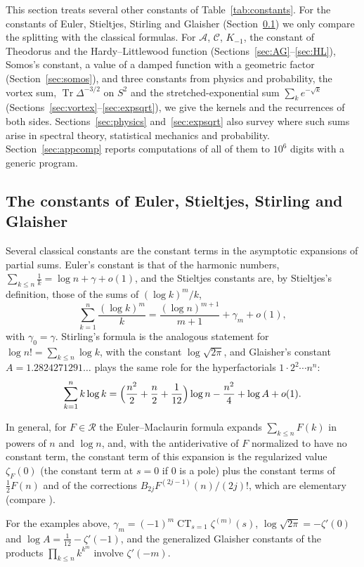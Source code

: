 \documentclass[11pt,reqno]{amsart}
\theoremstyle{definition}
\theoremstyle{remark}
\newcommand{\Reg}{\mathcal{R}}
\newcommand{\CT}{\operatorname*{CT}}
\begin{document}
This section treats several other constants of Table~\ref{tab:constants}. For the constants of Euler, Stieltjes, Stirling and
Glaisher (Section~\ref{sec:stieltjes}) we only compare the splitting with the classical formulas. For
$\mathcal A$, $\mathcal C$, $K_{-1}$, the constant of Theodorus and the Hardy--Littlewood function
(Sections~\ref{sec:AG}--\ref{sec:HL}), Somos's constant, a value of a damped function with a geometric factor
(Section~\ref{sec:somos}), and three constants from physics and probability, the vortex sum, $\operatorname{Tr}\Delta^{-3/2}$
on $S^2$ and the stretched-exponential sum $\sum_ke^{-\sqrt k}$ (Sections~\ref{sec:vortex}--\ref{sec:expsqrt}), we give the
kernels and the recurrences of both sides. Sections~\ref{sec:physics} and~\ref{sec:expsqrt} also survey where such sums
arise in spectral theory, statistical mechanics and probability.
Section~\ref{sec:appcomp} reports computations of all of them to $10^6$ digits with a generic program.

\subsection{The constants of Euler, Stieltjes, Stirling and Glaisher}\label{sec:stieltjes}
Several classical constants are the constant terms in the asymptotic expansions of partial sums.
Euler's constant is that of the harmonic numbers,
$\sum_{k\le n}\frac1k = \log n + \gamma + o(1)$, and the Stieltjes constants are, by
Stieltjes's definition, those of the sums of $(\log k)^m/k$,
\[
  \sum_{k=1}^{n}\frac{(\log k)^m}k = \frac{(\log n)^{m+1}}{m+1} + \gamma_m + o(1),
\]
with $\gamma_0 = \gamma$. Stirling's formula is the analogous statement for $\log n! = \sum_{k\le n}\log k$, with the
constant $\log\sqrt{2\pi}$, and Glaisher's constant $A = 1.2824271291\ldots$
plays the same role for the hyperfactorials $1 \cdot 2^2 \cdots n^n$:
\[
  \sum_{k=1}^{n}k\log k = \Bigl(\frac{n^2}2 + \frac n2 + \frac1{12}\Bigr)\log n - \frac{n^2}4 + \log A + o(1).
\]

In general, for $F \in \Reg$ the Euler--Maclaurin formula expands $\sum_{k\le n}F(k)$ in powers of $n$ and
$\log n$, and, with the antiderivative of $F$ normalized to have no constant term, the constant term of this
expansion is the regularized value $\zeta_F(0)$ (the constant term at $s = 0$ if $0$ is a pole) plus the constant terms
of $\frac12F(n)$ and of the corrections $B_{2j}F^{(2j-1)}(n)/(2j)!$, which are elementary (compare \cite{Zag06}).

For the examples above,
$\gamma_m = (-1)^m\CT_{s=1}\zeta^{(m)}(s)$, $\log\sqrt{2\pi} = -\zeta'(0)$ and $\log A = \frac1{12} - \zeta'(-1)$, and the generalized Glaisher constants of the products
$\prod_{k\le n}k^{k^m}$ involve $\zeta'(-m)$.
\end{document}
